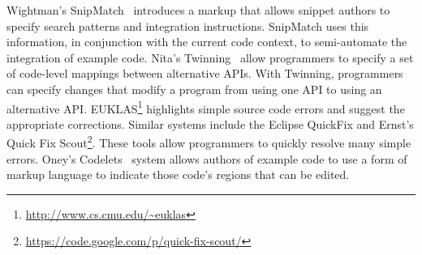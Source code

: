 Wightman's SnipMatch~\cite{Wightman:2012gc} introduces a markup that allows snippet authors to specify search patterns and integration instructions. SnipMatch uses this information, in conjunction with the current code context, to semi-automate the integration of example code. Nita's Twinning~\cite{Nita:2010en} allow programmers to specify a set of code-level mappings between alternative APIs. With Twinning, programmers can specify changes that modify a program from using one API to using an alternative API. EUKLAS\footnote{\url{http://www.cs.cmu.edu/~euklas}} highlights simple source code errors and suggest the appropriate corrections. Similar systems include the Eclipse QuickFix and Ernst's Quick Fix Scout\footnote{\url{https://code.google.com/p/quick-fix-scout/}}. These tools allow programmers to quickly resolve many simple errors. Oney's Codelets~\cite{Oney:2012ge} system allows authors of example code to use a form of markup language to indicate those code's regions that can be edited.

